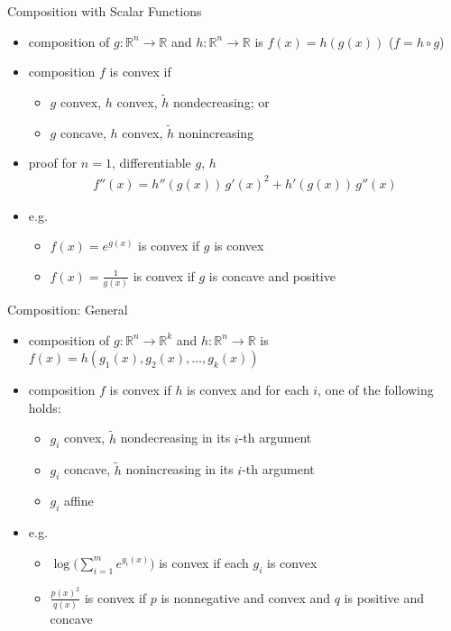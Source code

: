 \documentclass[10pt]{beamer}
\newcommand{\ds}{\displaystyle}
\theoremstyle{definition}
\begin{document}
\begin{frame}{Composition with Scalar Functions}

\begin{itemize}
  \item composition of $g:\mathbb{R}^n\to\mathbb{R}$ and $h:\mathbb{R}^n\to\mathbb{R}$ is $\ds f(x) = h(g(x))$ ($\ds f = h\circ g$)
  \item composition $f$ is convex if
    \begin{itemize}
      \item $g$ convex, $h$ convex, $\ds\widetilde{h}$ nondecreasing; or
      \item $g$ concave, $h$ convex, $\ds\widetilde{h}$ nonincreasing
    \end{itemize}
  \item proof for $n = 1$, differentiable $g$, $h$
    \begin{align*}
      f''(x) = h''(g(x))\,g'(x)^2 + h'(g(x))\,g''(x)
    \end{align*}
  \item e.g.
    \begin{itemize}
      \item $f(x) = e^{g(x)}$ is convex if $g$ is convex
      \item $\ds f(x) = \frac{1}{g(x)}$ is convex if $g$ is concave and positive
    \end{itemize}
\end{itemize}

\end{frame}

\begin{frame}{Composition: General}

\begin{itemize}
  \item composition of $g:\mathbb{R}^n\to\mathbb{R}^k$ and $h:\mathbb{R}^n\to\mathbb{R}$ is $\ds f(x) = h(g_1(x), g_2(x),\ldots, g_k(x))$
  \item composition $f$ is convex if $h$ is convex and for each $i$, one of the following holds:
    \begin{itemize}
      \item $g_i$ convex, $\ds\widetilde{h}$ nondecreasing in its $i$-th argument
      \item $g_i$ concave, $\ds\widetilde{h}$ nonincreasing in its $i$-th argument
      \item $g_i$ affine
    \end{itemize}
  \item e.g.
    \begin{itemize}
      \item $\ds\log\Big(\sum_{i = 1}^m e^{g_i(x)}\Big)$ is convex if each $g_i$ is convex
      \item $\ds\frac{p(x)^2}{q(x)}$ is convex if $p$ is nonnegative and convex and $q$ is positive and concave
    \end{itemize}
\end{itemize}

\end{frame}
\end{document}
